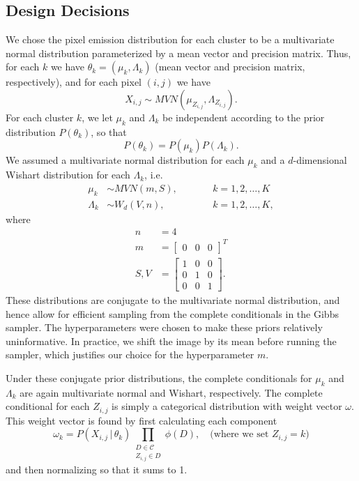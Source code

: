 \documentclass[12pt]{article}
\begin{document}
\subsection*{Design Decisions}
We chose the pixel emission distribution for each cluster to be a multivariate normal
distribution parameterized by a mean vector and precision matrix. 
Thus, for each $k$ we have $\theta_k = (\mu_k, \Lambda_k)$ (mean vector and precision matrix, 
respectively), and for each pixel $(i,j)$
we have
\[
X_{i,j} \sim MVN(\mu_{Z_{i,j}}, \Lambda_{Z_{i,j}}).
\]
For each cluster $k$, we let $\mu_k$ and $\Lambda_k$ be independent according
to the prior distribution $P(\theta_k)$, so that 
\[
P(\theta_k) = P(\mu_k)P(\Lambda_k).
\]
We assumed a multivariate normal distribution for each $\mu_k$ and a 
$d$-dimensional Wishart distribution for each $\Lambda_k$, i.e.
\begin{align*}
\mu_k &\sim MVN(m,S), \qquad && k=1,2,\ldots,K\\
\Lambda_k &\sim W_d(V,n), &&k=1,2,\ldots,K,
\end{align*}
where 
\begin{align*}
n &= 4\\
m &= \begin{bmatrix}
0 & 0 & 0
\end{bmatrix}^T\\
S, V &= \begin{bmatrix}
1 & 0 & 0\\
0 & 1 & 0\\
0 & 0 & 1
\end{bmatrix}.
\end{align*}
These distributions are conjugate to the multivariate normal distribution, and hence allow for
efficient sampling from the complete conditionals in the Gibbs sampler. The hyperparameters
were chosen to make these priors relatively uninformative.
In practice, we shift the image by its mean before running the sampler, 
which justifies our choice for the hyperparameter $m$.

Under these conjugate prior distributions, the complete conditionals for $\mu_k$ and $\Lambda_k$
are again multivariate normal and Wishart, respectively.
The complete conditional for each $Z_{i,j}$ is simply a categorical distribution with weight 
vector $\omega$. This weight vector is found by first calculating each component
\[
\omega_k = P(X_{i,j}\,|\,\theta_k)
\prod_{\substack{D \in \mathcal{C}\\
        Z_{i,j} \in D}}\phi(D), \quad \text{(where we set $Z_{i,j}=k$)}
\]
and then normalizing so that it sums to 1.
\end{document}
